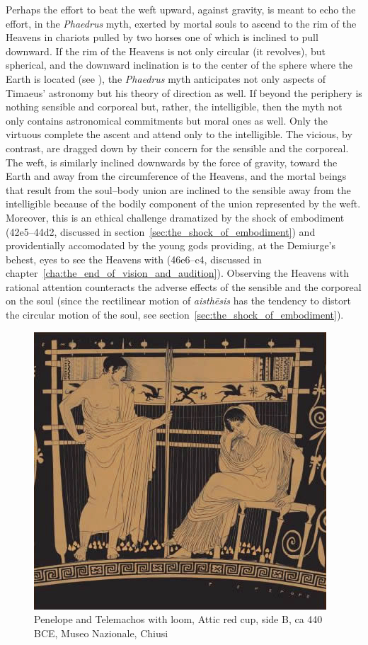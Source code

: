 Perhaps the effort to beat the weft upward, against gravity, is meant to echo the effort, in the \emph{Phaedrus} myth, exerted by mortal souls to ascend to the rim of the Heavens in chariots pulled by two horses one of which is inclined to pull downward. If the rim of the Heavens is not only circular (it revolves), but spherical, and the downward inclination is to the center of the sphere where the Earth is located (see \citealt[114--5]{Dicks:1970aa}), the \emph{Phaedrus} myth anticipates not only aspects of Timaeus' astronomy but his theory of direction as well. If beyond the periphery is nothing sensible and corporeal but, rather, the intelligible, then the myth not only contains astronomical commitments but moral ones as well. Only the virtuous complete the ascent and attend only to the intelligible. The vicious, by contrast, are dragged down by their concern for the sensible and the corporeal. The weft, is similarly inclined downwards by the force of gravity, toward the Earth and away from the circumference of the Heavens, and the mortal beings that result from the soul--body union are inclined to the sensible away from the intelligible because of the bodily component of the union represented by the weft. Moreover, this is an ethical challenge dramatized by the shock of embodiment (42e5--44d2, discussed in section~\ref{sec:the_shock_of_embodiment}) and providentially accomodated by the young gods providing, at the Demiurge's behest, eyes to see the Heavens with (46e6–c4, discussed in chapter~\ref{cha:the_end_of_vision_and_audition}). Observing the Heavens with rational attention counteracts the adverse effects of the sensible and the corporeal on the soul (since the rectilinear motion of \emph{aisthēsis} has the tendency to distort the circular motion of the soul, see section~\ref{sec:the_shock_of_embodiment}).

\begin{figure}[htbp]
     \centering
         \includegraphics[scale=0.80]{graphics/penelope_chiusi.jpg}
     \caption{Penelope and Telemachos with loom, Attic red cup, side B, ca 440 BCE, Museo Nazionale, Chiusi}
     \label{fig:loom}
\end{figure}

